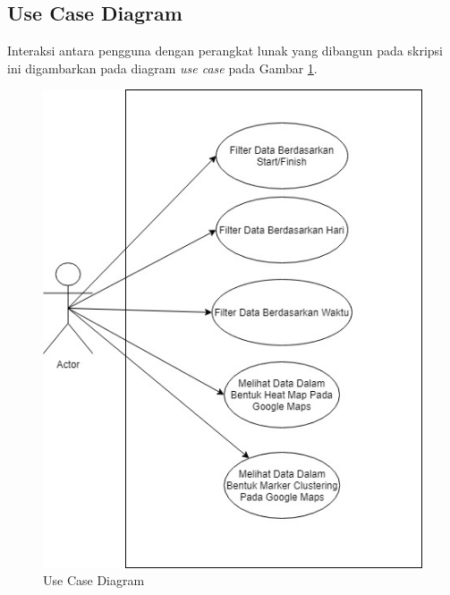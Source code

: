 \subsection{Use Case Diagram}
Interaksi antara pengguna dengan perangkat lunak yang dibangun pada skripsi ini digambarkan pada diagram \textit{use case} pada Gambar \ref{fig:usecase}.
\begin{figure}[H]
	\centering 
	\includegraphics[scale=0.6]{Gambar/KIRI USECASE.jpeg}  
	\caption[Use Case Diagram]{Use Case Diagram} 
	\label{fig:usecase} 
\end{figure} 


